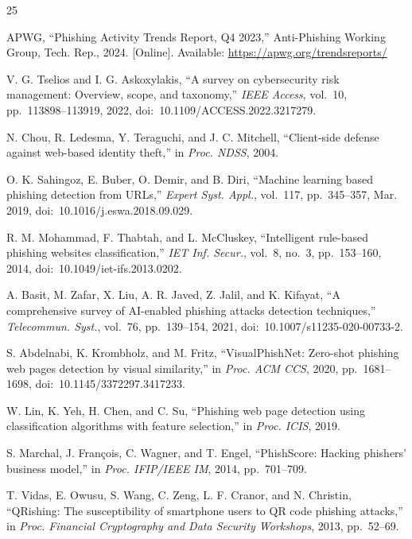 \documentclass[conference]{IEEEtran}
\begin{document}
\begin{thebibliography}{25}

APWG, ``Phishing Activity Trends Report, Q4 2023,'' Anti-Phishing Working Group, Tech. Rep., 2024.
[Online]. Available: \url{https://apwg.org/trendsreports/}

V. G. Tselios and I. G. Askoxylakis, ``A survey on cybersecurity risk management: Overview,
scope, and taxonomy,'' \emph{IEEE Access}, vol.~10, pp.~113898--113919, 2022,
doi:~10.1109/ACCESS.2022.3217279.

N. Chou, R. Ledesma, Y. Teraguchi, and J. C. Mitchell, ``Client-side defense against web-based
identity theft,'' in \emph{Proc. NDSS}, 2004.

O. K. Sahingoz, E. Buber, O. Demir, and B. Diri, ``Machine learning based phishing detection
from URLs,'' \emph{Expert Syst. Appl.}, vol.~117, pp.~345--357, Mar. 2019,
doi:~10.1016/j.eswa.2018.09.029.

R. M. Mohammad, F. Thabtah, and L. McCluskey, ``Intelligent rule-based phishing websites
classification,'' \emph{IET Inf. Secur.}, vol.~8, no.~3, pp.~153--160, 2014,
doi:~10.1049/iet-ifs.2013.0202.

A. Basit, M. Zafar, X. Liu, A. R. Javed, Z. Jalil, and K. Kifayat, ``A comprehensive survey of
AI-enabled phishing attacks detection techniques,'' \emph{Telecommun. Syst.}, vol.~76,
pp.~139--154, 2021, doi:~10.1007/s11235-020-00733-2.

S. Abdelnabi, K. Krombholz, and M. Fritz, ``VisualPhishNet: Zero-shot phishing web pages
detection by visual similarity,'' in \emph{Proc. ACM CCS}, 2020, pp.~1681--1698,
doi:~10.1145/3372297.3417233.

W. Lin, K. Yeh, H. Chen, and C. Su, ``Phishing web page detection using classification algorithms
with feature selection,'' in \emph{Proc. ICIS}, 2019.

S. Marchal, J. Fran\c{c}ois, C. Wagner, and T. Engel, ``PhishScore: Hacking phishers' business
model,'' in \emph{Proc. IFIP/IEEE IM}, 2014, pp.~701--709.

T. Vidas, E. Owusu, S. Wang, C. Zeng, L. F. Cranor, and N. Christin, ``QRishing: The susceptibility
of smartphone users to QR code phishing attacks,'' in \emph{Proc. Financial Cryptography and Data
Security Workshops}, 2013, pp.~52--69.


\end{thebibliography}
\end{document}

